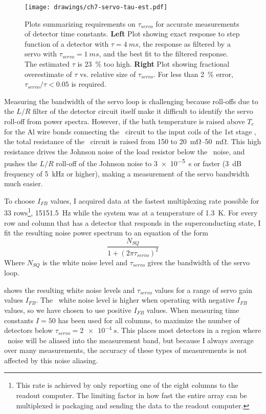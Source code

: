 \begin{figure*}
\texttt{[image: drawings/ch7-servo-tau-est.pdf]}
\caption[Required $\tau_{servo}$]{
Plots summarizing requirements on $\tau_{servo}$ for accurate measurements of detector time constants.
\textbf{Left} Plot showing exact response to step function of a detector with $\tau = \SI{4}{ms}$, the response as filtered by a servo with $\tau_{servo} = \SI{1}{ms}$, and the best fit to the filtered response. The estimated $\tau$ is \SI{23}{\percent} too high.
\textbf{Right} Plot showing fractional overestimate of $\tau$ vs. relative size of $\tau_{servo}$.
For less than \SI{2}{\percent} error, $\tau_{servo}/\tau < \num{0.05}$ is required.
}
\label{fig:ch7-servo-tau-est}
\end{figure*}

Measuring the bandwidth of the servo loop is challenging because roll-offs due to the $L/R$ filter of the detector circuit itself make it difficult to identify the servo roll-off from power spectra.
However, if the bath temperature is raised above $T_c$ for the Al wire bonds connecting the \TES\ circuit to the input coils of the 1st stage \SQUIDs, the total resistance of the \TES\ circuit is raised from \SI{150}{\uohm} to \SIrange{20}{50}{\mohm}.
This high resistance drives the Johnson noise of the load resistor below the \SQUID\ noise, and pushes the $L/R$ roll-off of the Johnson noise to \SI{3e-5}{s} or faster (\SI{3}{\dB} frequency of \SI{5}{\kilo\Hz} or higher), making a measurement of the servo bandwidth much easier.

To choose $I_{FB}$ values, I acquired data at the fastest multiplexing rate possible for 33 rows\footnote{This rate is achieved by only reporting one of the eight columns to the readout computer. The limiting factor in how fast the entire array can be multiplexed is packaging and sending the data to the readout computer.}, \SI{15151.5}{Hz} while the system was at a temperature of \SI{1.3}{\K}.
For every row and column that has a detector that responds in the superconducting state, I fit the resulting noise power spectrum to an equation of the form
\begin{equation}
  \frac{N_{SQ}}{1 + (2 \pi \tau_{servo})^2}
\end{equation}
Where $N_{SQ}$ is the white noise level and $\tau_{servo}$ gives the bandwidth of the servo loop.

 shows the resulting white noise levels and $\tau_{servo}$ values for a range of servo gain values $I_{FB}$.
The \SQUID\ white noise level is higher when operating with negative $I_{FB}$ values, so we have chosen to use positive $I_{FB}$ values.
When measuring time constants $I=50$ has been used for all columns, to maximize the number of detectors below $\tau_{servo} = \SI{2e-4}{s}$.
This places most detectors in a region where \SQUID\ noise will be aliased into the measurement band, but because I always average over many measurements, the accuracy of these types of measurements is not affected by this noise aliasing.

